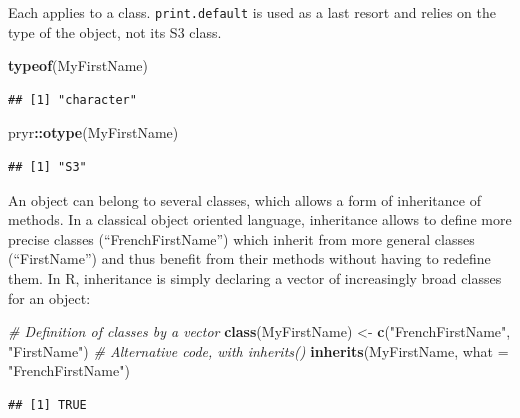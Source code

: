 \documentclass[
  12pt,
  american,
  a4paper,
  extrafontsizes,onecolumn,openright
  ]{memoir}
\newenvironment{Shaded}{\begin{snugshade}}{\end{snugshade}}
\newcommand{\AttributeTok}[1]{\textcolor[rgb]{0.13,0.29,0.53}{#1}}
\newcommand{\CommentTok}[1]{\textcolor[rgb]{0.56,0.35,0.01}{\textit{#1}}}
\newcommand{\FunctionTok}[1]{\textcolor[rgb]{0.13,0.29,0.53}{\textbf{#1}}}
\newcommand{\NormalTok}[1]{#1}
\newcommand{\OtherTok}[1]{\textcolor[rgb]{0.56,0.35,0.01}{#1}}
\newcommand{\SpecialCharTok}[1]{\textcolor[rgb]{0.81,0.36,0.00}{\textbf{#1}}}
\newcommand{\StringTok}[1]{\textcolor[rgb]{0.31,0.60,0.02}{#1}}
\begin{document}
\normalsize

Each applies to a class. \texttt{print.default} is used as a last resort and relies on the type of the object, not its S3 class.

\scriptsize

\begin{Shaded}
\begin{Highlighting}[]
\FunctionTok{typeof}\NormalTok{(MyFirstName)}
\end{Highlighting}
\end{Shaded}

\begin{verbatim}
## [1] "character"
\end{verbatim}

\begin{Shaded}
\begin{Highlighting}[]
\NormalTok{pryr}\SpecialCharTok{::}\FunctionTok{otype}\NormalTok{(MyFirstName)}
\end{Highlighting}
\end{Shaded}

\begin{verbatim}
## [1] "S3"
\end{verbatim}

\normalsize

An object can belong to several classes, which allows a form of inheritance of methods.
In a classical object oriented language, inheritance allows to define more precise classes (\enquote{FrenchFirstName}) which inherit from more general classes (\enquote{FirstName}) and thus benefit from their methods without having to redefine them.
In R, inheritance is simply declaring a vector of increasingly broad classes for an object:

\scriptsize

\begin{Shaded}
\begin{Highlighting}[]
\CommentTok{\# Definition of classes by a vector}
\FunctionTok{class}\NormalTok{(MyFirstName) }\OtherTok{\textless{}{-}} \FunctionTok{c}\NormalTok{(}\StringTok{"FrenchFirstName"}\NormalTok{, }\StringTok{"FirstName"}\NormalTok{)}
\CommentTok{\# Alternative code, with inherits()}
\FunctionTok{inherits}\NormalTok{(MyFirstName, }\AttributeTok{what =} \StringTok{"FrenchFirstName"}\NormalTok{)}
\end{Highlighting}
\end{Shaded}

\begin{verbatim}
## [1] TRUE
\end{verbatim}
\end{document}
